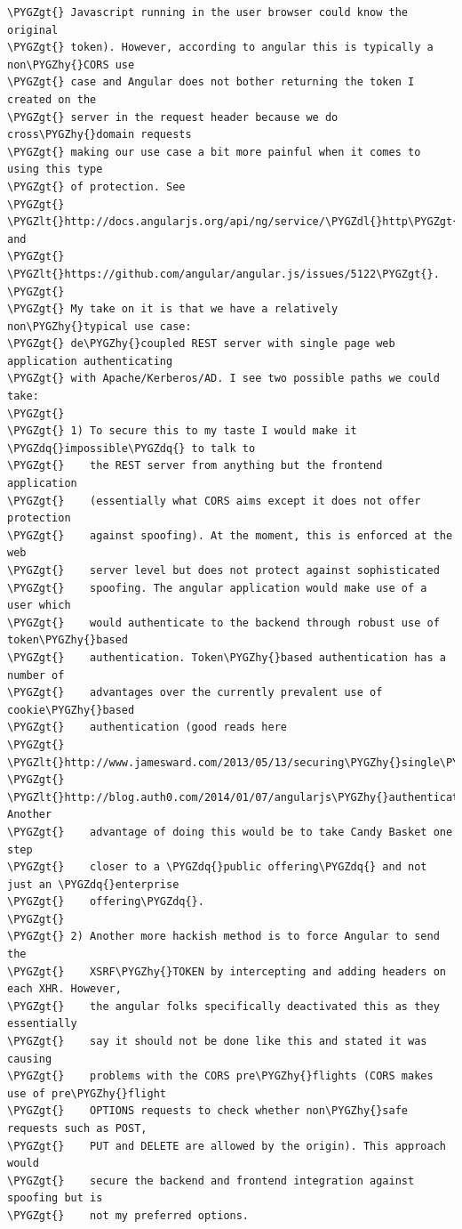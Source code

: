\documentclass[letterpaper,10pt,english]{sphinxmanual}
\def\PYGZlt{\char`\<}
\def\PYGZgt{\char`\>}
\def\PYGZdl{\char`\$}
\def\PYGZhy{\char`\-}
\def\PYGZdq{\char`\"}
\begin{document}
\begin{Verbatim}[commandchars=\\\{\}]
\PYGZgt{} Javascript running in the user browser could know the original
\PYGZgt{} token). However, according to angular this is typically a non\PYGZhy{}CORS use
\PYGZgt{} case and Angular does not bother returning the token I created on the
\PYGZgt{} server in the request header because we do cross\PYGZhy{}domain requests
\PYGZgt{} making our use case a bit more painful when it comes to using this type
\PYGZgt{} of protection. See
\PYGZgt{} \PYGZlt{}http://docs.angularjs.org/api/ng/service/\PYGZdl{}http\PYGZgt{} and
\PYGZgt{} \PYGZlt{}https://github.com/angular/angular.js/issues/5122\PYGZgt{}.
\PYGZgt{}
\PYGZgt{} My take on it is that we have a relatively non\PYGZhy{}typical use case:
\PYGZgt{} de\PYGZhy{}coupled REST server with single page web application authenticating
\PYGZgt{} with Apache/Kerberos/AD. I see two possible paths we could take:
\PYGZgt{}
\PYGZgt{} 1) To secure this to my taste I would make it \PYGZdq{}impossible\PYGZdq{} to talk to
\PYGZgt{}    the REST server from anything but the frontend application
\PYGZgt{}    (essentially what CORS aims except it does not offer protection
\PYGZgt{}    against spoofing). At the moment, this is enforced at the web
\PYGZgt{}    server level but does not protect against sophisticated
\PYGZgt{}    spoofing. The angular application would make use of a user which
\PYGZgt{}    would authenticate to the backend through robust use of token\PYGZhy{}based
\PYGZgt{}    authentication. Token\PYGZhy{}based authentication has a number of
\PYGZgt{}    advantages over the currently prevalent use of cookie\PYGZhy{}based
\PYGZgt{}    authentication (good reads here
\PYGZgt{}    \PYGZlt{}http://www.jamesward.com/2013/05/13/securing\PYGZhy{}single\PYGZhy{}page\PYGZhy{}apps\PYGZhy{}and\PYGZhy{}rest\PYGZhy{}services\PYGZgt{},
\PYGZgt{}    \PYGZlt{}http://blog.auth0.com/2014/01/07/angularjs\PYGZhy{}authentication\PYGZhy{}with\PYGZhy{}cookies\PYGZhy{}vs\PYGZhy{}token/\PYGZgt{}). Another
\PYGZgt{}    advantage of doing this would be to take Candy Basket one step
\PYGZgt{}    closer to a \PYGZdq{}public offering\PYGZdq{} and not just an \PYGZdq{}enterprise
\PYGZgt{}    offering\PYGZdq{}.
\PYGZgt{}
\PYGZgt{} 2) Another more hackish method is to force Angular to send the
\PYGZgt{}    XSRF\PYGZhy{}TOKEN by intercepting and adding headers on each XHR. However,
\PYGZgt{}    the angular folks specifically deactivated this as they essentially
\PYGZgt{}    say it should not be done like this and stated it was causing
\PYGZgt{}    problems with the CORS pre\PYGZhy{}flights (CORS makes use of pre\PYGZhy{}flight
\PYGZgt{}    OPTIONS requests to check whether non\PYGZhy{}safe requests such as POST,
\PYGZgt{}    PUT and DELETE are allowed by the origin). This approach would
\PYGZgt{}    secure the backend and frontend integration against spoofing but is
\PYGZgt{}    not my preferred options.
\end{Verbatim}
\end{document}
